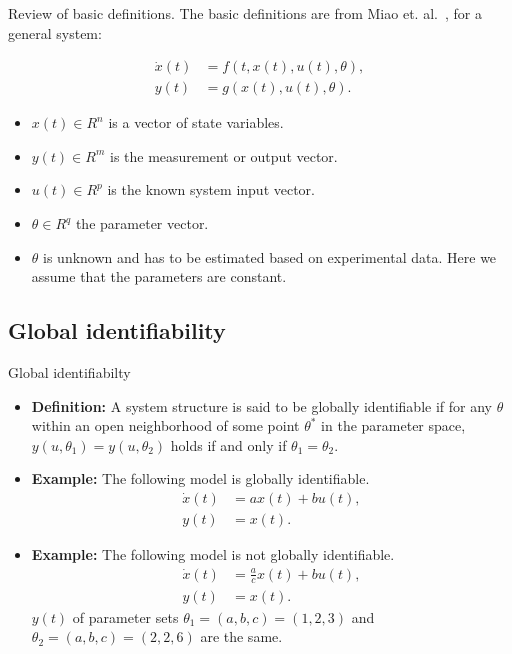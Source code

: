 \documentclass[10pt]{beamer}
\begin{document}
\begin{frame}{Review of basic definitions.}
	The basic definitions are from Miao et. al.~, for a general system:
	
	\begin{subequations}
		\begin{align}
			\dot x (t) &= f(t,x(t),u(t),\theta), \\
			y(t) &= g(x(t), u(t), \theta).
		\end{align}
	\end{subequations}
	
	\begin{itemize}
		\item $x(t) \in R^n$ is a vector of state variables.
		\item $y(t) \in R^m$ is the measurement or output vector.
		\item $u(t) \in R^p$ is the known system input vector.
		\item $\theta \in R^q$ the parameter vector.
		\item $\theta$ is unknown and has to be estimated based on experimental data. Here we assume that the parameters are constant.
	\end{itemize}
\end{frame}

\subsection{Global identifiability}

\begin{frame}{Global identifiabilty}
	\begin{itemize}
		\item \textbf{Definition: } A system structure is said to be globally identifiable if for any $\theta$ within an open neighborhood of some point $\theta^*$ in the parameter space, $y(u,\theta_1)=y(u,\theta_2)$ holds if and only if $\theta_1=\theta_2$.
		\item \textbf{Example: } The following model is globally identifiable.
			\begin{subequations} \label{eq:1}
				\begin{align}
					\dot x(t) &= a x(t) + b u(t), \\
					y(t) &= x(t).
				\end{align}
			\end{subequations}
		\item \textbf{Example: } The following model is not globally identifiable.
		\begin{subequations} \label{eq:2}
			\begin{align}
				\dot x(t) &= \frac{a}{c} x(t) + b u(t), \\
				y(t) &= x(t).
			\end{align}
		\end{subequations}
		$y(t)$ of parameter sets $\theta_1=(a,b,c)= (1,2,3)$ and $\theta_2=(a,b,c)= (2,2,6)$ are the same.
	\end{itemize}
	
\end{frame}
\end{document}
